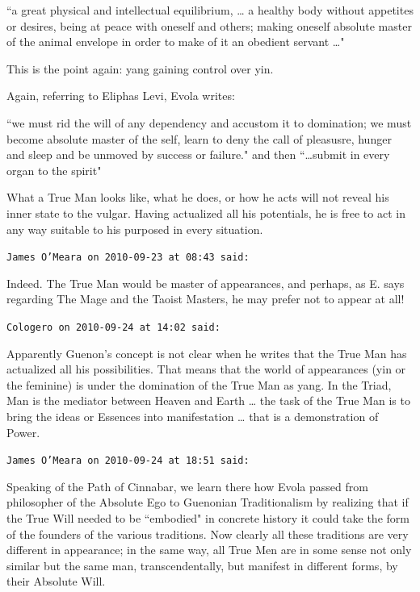 \begin{footnotesize}
\begin{sffamily}
``a great physical and intellectual equilibrium, … a healthy body without appetites or desires, being at peace with oneself and others; making oneself absolute master of the animal envelope in order to make of it an obedient servant …"

This is the point again: yang gaining control over yin.

Again, referring to Eliphas Levi, Evola writes:

``we must rid the will of any dependency and accustom it to domination; we must become absolute master of the self, learn to deny the call of pleasusre, hunger and sleep and be unmoved by success or failure." and then ``…submit in every organ to the spirit"

What a True Man looks like, what he does, or how he acts will not reveal his inner state to the vulgar. Having actualized all his potentials, he is free to act in any way suitable to his purposed in every situation.


\hfill

\texttt{James O'Meara on 2010-09-23 at 08:43 said: }

Indeed. The True Man would be master of appearances, and perhaps, as E. says regarding The Mage and the Taoist Masters, he may prefer not to appear at all!


\hfill

\texttt{Cologero on 2010-09-24 at 14:02 said: }

Apparently Guenon's concept is not clear when he writes that the True Man has actualized all his possibilities. That means that the world of appearances (yin or the feminine) is under the domination of the True Man as yang. In the Triad, Man is the mediator between Heaven and Earth … the task of the True Man is to bring the ideas or Essences into manifestation … that is a demonstration of Power.


\hfill

\texttt{James O'Meara on 2010-09-24 at 18:51 said: }

Speaking of the Path of Cinnabar, we learn there how Evola passed from philosopher of the Absolute Ego to Guenonian Traditionalism by realizing that if the True Will needed to be ``embodied" in concrete history it could take the form of the founders of the various traditions. Now clearly all these traditions are very different in appearance; in the same way, all True Men are in some sense not only similar but the same man, transcendentally, but manifest in different forms, by their Absolute Will.



\end{sffamily}
\end{footnotesize}
